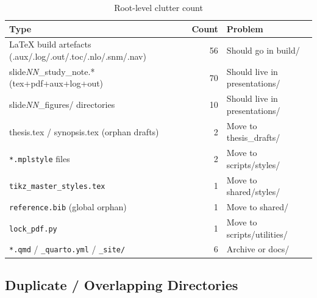 \documentclass[11pt,a4paper]{article}
\begin{document}
\begin{table}[h!]
\centering
\caption{Root-level clutter count}
\begin{tabular}{lrl}
\toprule
\textbf{Type} & \textbf{Count} & \textbf{Problem} \\
\midrule
LaTeX build artefacts (.aux/.log/.out/.toc/.nlo/.snm/.nav) & 56 & Should go in build/ \\
slide\textit{NN}\_study\_note.* (tex+pdf+aux+log+out) & 70 & Should live in presentations/ \\
slide\textit{NN}\_figures/ directories & 10 & Should live in presentations/ \\
thesis.tex / synopsis.tex (orphan drafts) & 2 & Move to thesis\_drafts/ \\
\texttt{*.mplstyle} files & 2 & Move to scripts/styles/ \\
\texttt{tikz\_master\_styles.tex} & 1 & Move to shared/styles/ \\
\texttt{reference.bib} (global orphan) & 1 & Move to shared/ \\
\texttt{lock\_pdf.py} & 1 & Move to scripts/utilities/ \\
\texttt{*.qmd} / \texttt{\_quarto.yml} / \texttt{\_site/} & 6 & Archive or docs/ \\
\bottomrule
\end{tabular}
\end{table}

\subsection{Duplicate / Overlapping Directories}
\end{document}
